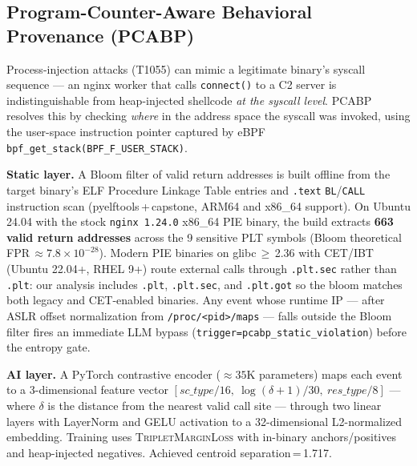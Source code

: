 \documentclass[journal]{IEEEtran}
\begin{document}
\subsection{Program-Counter-Aware Behavioral Provenance (PCABP)}\label{sec:pcabp}

Process-injection attacks (T1055) can mimic a legitimate binary's syscall
sequence --- an nginx worker that calls \texttt{connect()} to a C2 server is
indistinguishable from heap-injected shellcode \emph{at the syscall level}.
PCABP resolves this by checking \emph{where} in the address space the syscall
was invoked, using the user-space instruction pointer captured by eBPF
\texttt{bpf\_get\_stack(BPF\_F\_USER\_STACK)}.

\noindent\textbf{Static layer.}
A Bloom filter of valid return addresses is built offline from the target
binary's ELF Procedure Linkage Table entries and \texttt{.text}
\texttt{BL}/\texttt{CALL} instruction scan (pyelftools\,+\,capstone, ARM64
and x86\_64 support). On Ubuntu 24.04 with the stock \texttt{nginx 1.24.0}
x86\_64 PIE binary, the build extracts \textbf{663 valid return addresses}
across the 9 sensitive PLT symbols (Bloom theoretical
FPR\,$\approx 7.8 \times 10^{-28}$). Modern PIE binaries on glibc\,$\geq$\,2.36
with CET/IBT (Ubuntu 22.04+, RHEL 9+) route external calls through
\texttt{.plt.sec} rather than \texttt{.plt}: our analysis includes
\texttt{.plt}, \texttt{.plt.sec}, and \texttt{.plt.got} so the bloom matches
both legacy and CET-enabled binaries. Any event whose runtime IP --- after
ASLR offset normalization from \texttt{/proc/<pid>/maps} --- falls outside the
Bloom filter fires an immediate LLM bypass
(\texttt{trigger=pcabp\_static\_violation}) before the entropy gate.

\noindent\textbf{AI layer.}
A PyTorch contrastive encoder ($\approx 35$K parameters) maps each event to a
3-dimensional feature vector $[\textit{sc\_type}/16,\ \log(\delta+1)/30,\
\textit{res\_type}/8]$ --- where $\delta$ is the distance from the nearest
valid call site --- through two linear layers with LayerNorm and GELU
activation to a 32-dimensional L2-normalized embedding.  Training uses
\textsc{TripletMarginLoss} with in-binary anchors/positives and heap-injected
negatives.  Achieved centroid separation\,=\,1.717.
\end{document}
